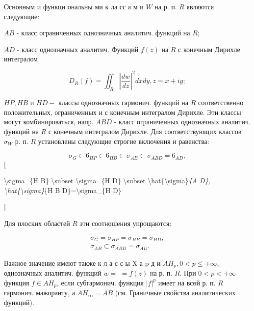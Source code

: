 \documentclass[10pt]{article}
\begin{document}
Основным и функци ональны ми к ла сс а м и $W$ на р. п. $R$ являются следующие:



$A B$ - класс ограниченных однозначных аналитич. функций на $R$;



$A D$ - класс однозначных аналитич. Функций $f(z)$ на $R$ с конечным Дирихле интегралом



\[

D_{R}(f)=\iint_{R}\left|\frac{d w}{d z}\right|^{2} d x d y, z=x+i y ;

\]



$H P, H B$ и $H D-$ классы однозначных гармонич. функций на $R$ соответственно положительных, ограниченных и с конечным интегралом Дирихле. Эти классы могут комбинироваться, напр. $A B D$ - класс ограниченных однозначных аналитич. функций на $R$ с конечным интегралом Дирихле. Для соответствующих классов $\sigma_{W}$ р. п. $R$ установлены следующие строгие включения и равенства:



\[

\sigma_{G} \subset 6_{H P} \subset 6_{H B} \subset \sigma_{A B} \subset \sigma_{A B D}=6_{A D},

\][



\textbackslash sigma\_\{H B\} \textbackslash subset \textbackslash sigma\_\{H D\} \textbackslash subset \textbackslash hat\{\textbackslash sigma\}\textit{\{A D\}, \textbackslash hat\{\textbackslash sigma\}}\{H B D\}=\textbackslash sigma\_\{H D\}

]



Для плоских областей $R$ эти соотношения упрощаются:



\[

\begin{gathered}

\sigma_{G}=\sigma_{H P}=\sigma_{H B}=\sigma_{H D}, \\

\sigma_{A B} \subset \sigma_{A B D}=\sigma_{A D} .

\end{gathered}

\]



Важное значение имеют также к л а с с ы $\mathrm{X}$ а $\mathrm{p}$ д и $A H_{p}, 0<p \leqslant+\infty$, однозначных аналитич. функций $w=$ $=f(z)$ на р. п. $R$. При $0<p<+\infty$ функция $f \in A H_{p}$, если субгармонич. функция $|f|^{p}$ имеет на всөй р. п. $R$ гармонич. мажоранту, а $A H_{\infty}=A B$ (см. Граничные свойства аналитических функций).
\end{document}
